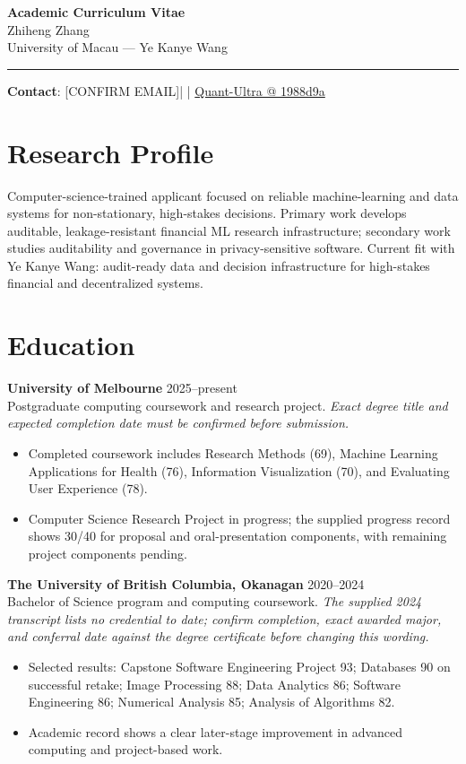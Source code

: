\documentclass[11pt]{article}
\makeatletter
\newcommand{\ApplicantName}{Zhiheng Zhang}
\newcommand{\ApplicantEmail}{[CONFIRM EMAIL]}
\newcommand{\ApplicantPhone}{[CONFIRM PHONE]}
\newcommand{\ApplicantGitHub}{\href{https://github.com/zhiheng-zhang-Mera/Quant-Ultra/tree/1988d9a8530da91a8158de864d098ea869098923}{Quant-Ultra @ 1988d9a}}
\makeatother
\begin{document}
\begin{center}
{\LARGE\bfseries Academic Curriculum Vitae}\\[0.25em]
{\large \ApplicantName}\\
University of Macau --- Ye Kanye Wang
\end{center}
\vspace{0.35em}\hrule\vspace{0.65em}

\textbf{Contact}: \ApplicantEmail\quad | \quad \ApplicantPhone\quad | \quad \ApplicantGitHub

\section*{Research Profile}
Computer-science-trained applicant focused on reliable machine-learning and data systems for non-stationary, high-stakes decisions. Primary work develops auditable, leakage-resistant financial ML research infrastructure; secondary work studies auditability and governance in privacy-sensitive software. Current fit with Ye Kanye Wang: audit-ready data and decision infrastructure for high-stakes financial and decentralized systems.

\section*{Education}
\textbf{University of Melbourne} \hfill 2025--present\\
Postgraduate computing coursework and research project. \textit{Exact degree title and expected completion date must be confirmed before submission.}
\begin{itemize}
\item Completed coursework includes Research Methods (69), Machine Learning Applications for Health (76), Information Visualization (70), and Evaluating User Experience (78).
\item Computer Science Research Project in progress; the supplied progress record shows 30/40 for proposal and oral-presentation components, with remaining project components pending.
\end{itemize}

\textbf{The University of British Columbia, Okanagan} \hfill 2020--2024\\
Bachelor of Science program and computing coursework. \textit{The supplied 2024 transcript lists no credential to date; confirm completion, exact awarded major, and conferral date against the degree certificate before changing this wording.}
\begin{itemize}
\item Selected results: Capstone Software Engineering Project 93; Databases 90 on successful retake; Image Processing 88; Data Analytics 86; Software Engineering 86; Numerical Analysis 85; Analysis of Algorithms 82.
\item Academic record shows a clear later-stage improvement in advanced computing and project-based work.
\end{itemize}
\end{document}
